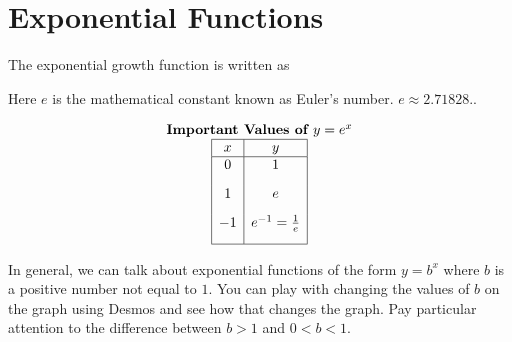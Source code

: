 \documentclass[nooutcomes]{ximera}
\begin{document}
\newpage


\section{Exponential Functions}
The exponential growth function is written as

\begin{image}
\end{image}

Here $e$ is the mathematical constant known as Euler's number.  $e \approx 2.71828 .$.

\begin{image}
\end{image}

\[
\begin{array}{c}
 \text{\textbf{Important Values of $y=e^x$}} \\
\begin{array}{|c|c|}
\hline
 x & y \\
 \hline 
 0&1\\[2ex]
 1&e\\[2ex]
 -1&e^{-1}=\frac{1}{e}\\[2ex]
\hline
\end{array}
\end{array}
 \]

In general, we can talk about exponential functions of the form $y=b^{x}$ where $b$ is a positive number not equal to $1$.  You can play with changing the values of $b$ on the graph using Desmos and see how that changes the graph.  Pay particular attention to the difference between $b>1$ and $0<b<1$.

\begin{center}  
\end{center}
\end{document}
